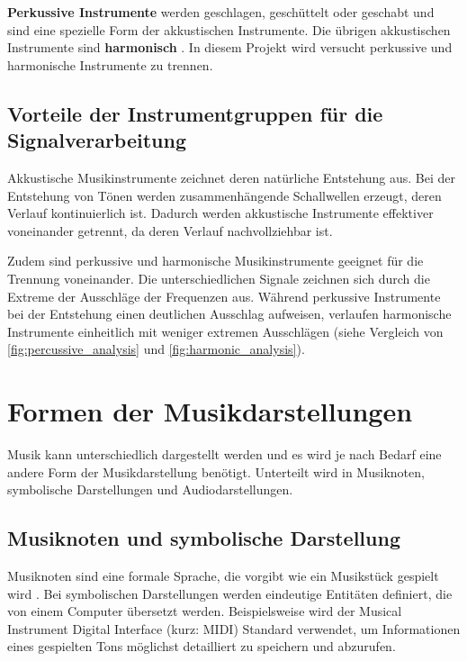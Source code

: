 \par

\textbf{Perkussive Instrumente} werden geschlagen, geschüttelt oder geschabt und sind eine spezielle Form der akkustischen Instrumente.
Die übrigen akkustischen Instrumente sind \textbf{harmonisch} \parencite{acoustic_electric_digital_instruments}.
In diesem Projekt wird versucht perkussive und harmonische Instrumente zu trennen.

%
\subsection{Vorteile der Instrumentgruppen für die Signalverarbeitung}
%

Akkustische Musikinstrumente zeichnet deren natürliche Entstehung aus. Bei der Entstehung von Tönen werden zusammenhängende Schallwellen erzeugt, deren Verlauf kontinuierlich ist. Dadurch werden akkustische Instrumente effektiver voneinander getrennt, da deren Verlauf nachvollziehbar ist.

\par

Zudem sind perkussive und harmonische Musikinstrumente geeignet für die Trennung voneinander. Die unterschiedlichen Signale zeichnen sich durch die Extreme der Ausschläge der Frequenzen aus. Während perkussive Instrumente bei der Entstehung einen deutlichen Ausschlag aufweisen, verlaufen harmonische Instrumente einheitlich mit weniger extremen Ausschlägen (siehe Vergleich von \cref{fig:percussive_analysis} und \cref{fig:harmonic_analysis}).

%
\section{Formen der Musikdarstellungen}
%

Musik kann unterschiedlich dargestellt werden und es wird je nach Bedarf eine andere Form der Musikdarstellung benötigt. Unterteilt wird in Musiknoten, symbolische Darstellungen und Audiodarstellungen.

%
\subsection{Musiknoten und symbolische Darstellung}
%

Musiknoten sind eine formale Sprache, die vorgibt wie ein Musikstück gespielt wird \parencite{sheet_music_representations}.
Bei symbolischen Darstellungen werden eindeutige Entitäten definiert, die von einem Computer übersetzt werden.
Beispielsweise wird der Musical Instrument Digital Interface (kurz: MIDI) Standard verwendet, um Informationen eines gespielten Tons möglichst detailliert zu speichern und abzurufen.

